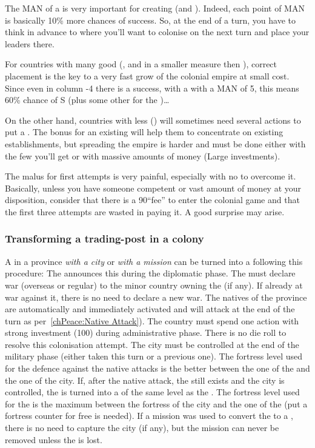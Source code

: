 \begin{playtip}
  The MAN of a \LeaderC is very important for creating \COL (and \TP). Indeed,
  each point of MAN is basically 10\% more chances of success. So, at the end
  of a turn, you have to think in advance to where you'll want to colonise on
  the next turn and place your leaders there.

  For countries with many good \LeaderC (\HIS, \POR and in a smaller measure
  \HOL then \FRA), correct placement is the key to a very fast grow of the
  colonial empire at small cost. Since even in column -4 there is a success,
  with a \LeaderC with a MAN of 5, this means 60\% chance of S (plus some
  other for the \undemi)\ldots

  On the other hand, countries with less \LeaderC (\ANG) will sometimes need
  several actions to put a \COL. The bonus for an existing \COL will help them
  to concentrate on existing establishments, but spreading the empire is
  harder and must be done either with the few \LeaderC you'll get or with
  massive amounts of money (Large investments).

  The malus for first attempts is very painful, especially with no \LeaderC to
  overcome it. Basically, unless you have someone competent or vast amount of
  money at your disposition, consider that there is a 90\ducats ``fee'' to
  enter the colonial game and that the first three attempts are wasted in
  paying it. A good surprise may arise.
\end{playtip}


\subsubsection{Transforming a trading-post in a colony}\label{chExpenses:TP to
  Col}
\aparag A \TP in a province \emph{with a city} or \emph{with a mission} can be
turned into a \COL following this procedure:
\bparag The \MAJ announces this during the diplomatic phase.
\bparag The \MAJ must declare war (overseas or regular) to the \ROTW minor
country owning the \Area (if any). If already at war against it, there is no
need to declare a new war.
\bparag The natives of the province are automatically and immediately
activated and will attack at the end of the turn as per~\ref{chPeace:Native
  Attack}).
\bparag The country must spend one \COL action with strong investment
(100\ducats) during administrative phase. There is no die roll to resolve this
colonisation attempt.
\bparag The city must be controlled at the end of the military phase (either
taken this turn or a previous one). The fortress level used for the defence
against the native attacks is the better between the one of the \TP and the
one of the city.
\bparag If, after the native attack, the \TP still exists and the city is
controlled, the \TP is turned into a \COL of the same level as the \TP. The
fortress level used for the \COL is the maximum between the fortress of the
city and the one of the \TP (put a fortress counter for free is needed).
\bparag If a mission was used to convert the \TP to a \COL, there is no need
to capture the city (if any), but the mission can never be removed unless the
\COL is lost.

